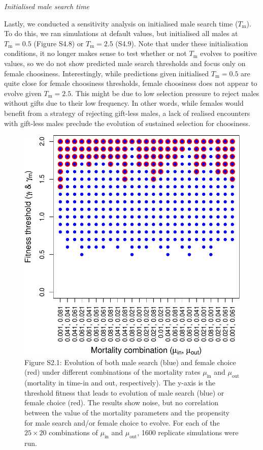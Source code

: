 \documentclass[
]{article}
\begin{document}
\emph{Initialised male search time}

Lastly, we conducted a sensitivity analysis on initialised male search
time (\(T_{\mathrm{m}}\)). To do this, we ran simulations at default
values, but initialised all males at \(T_{\mathrm{m}} = 0.5\) (Figure
S4.8) or \(T_{\mathrm{m}} = 2.5\) (S4.9). Note that under these
initialisation conditions, it no longer makes sense to test whether or
not \(T_{\mathrm{m}}\) evolves to positive values, so we do not show
predicted male search thresholds and focus only on female choosiness.
Interestingly, while predictions given initialised
\(T_{\mathrm{m}} = 0.5\) are quite close for female choosiness
thresholds, female choosiness does not appear to evolve given
\(T_{\mathrm{m}} = 2.5\). This might be due to low selection pressure to
reject males without gifts due to their low frequency. In other words,
while females would benefit from a strategy of rejecting gift-less
males, a lack of realised encounters with gift-less males preclude the
evolution of sustained selection for choosiness.

\clearpage

\captionsetup{labelformat=empty}

\begin{figure}
\centering
\includegraphics{ms_biorxiv_files/figure-latex/unnamed-chunk-6-1.pdf}
\caption{Figure S2.1: Evolution of both male search (blue) and female
choice (red) under different combinations of the mortality rates
\(\mu_{\mathrm{in}}\) and \(\mu_{\mathrm{out}}\) (mortality in time-in
and out, respectively). The y-axis is the threshold fitness that leads
to evolution of male search (blue) or female choice (red). The results
show noise, but no correlation between the value of the mortality
parameters and the propensity for male search and/or female choice to
evolve. For each of the \(25 \times 20\) combinations of
\(\mu_{\mathrm{in}}\) and \(\mu_{\mathrm{out}}\), 1600 replicate
simulations were run.}
\end{figure}
\end{document}

